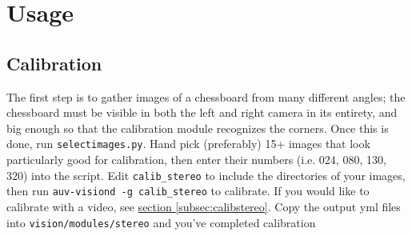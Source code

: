\documentclass[11pt]{article}
\begin{document}
\section{Usage}
\subsection{Calibration}
The first step is to gather images of a chessboard from many different angles; the chessboard must be visible in both the left and right camera in its entirety, and big enough so that the calibration module recognizes the corners. Once this is done, run \texttt{selectimages.py}. Hand pick (preferably) 15+ images that look particularly good for calibration, then enter their numbers (i.e. 024, 080, 130, 320) into the script. Edit \texttt{calib\_stereo} to include the directories of your images, then run \texttt{auv-visiond -g calib\_stereo} to calibrate. If you would like to calibrate with a video, see \hyperref[subsec:calibstereo]{section \ref*{subsec:calibstereo}}. Copy the output yml files into \texttt{vision/modules/stereo} and you've completed calibration
\end{document}
